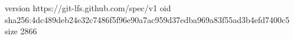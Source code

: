 version https://git-lfs.github.com/spec/v1
oid sha256:4dc489deb24e32c7486f5f96e90a7ac959d37edba969a83f55ad3b4efd7400c5
size 2866
